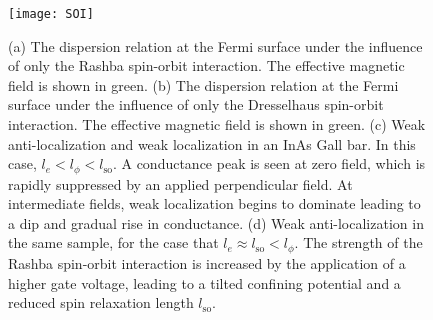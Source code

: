 \begin{figure}
  \texttt{[image: SOI]}
  \caption[The spin orbit interaction and weak anti-localization]
  {\label{fig:SOI}(a) The dispersion relation at the Fermi surface under the influence of only the Rashba spin-orbit interaction. The effective
  magnetic field is shown in green. (b) The dispersion relation at the Fermi surface under the influence of only the Dresselhaus spin-orbit interaction.
  The effective magnetic field is shown in green. (c) Weak anti-localization and weak localization in an InAs Gall bar. In this case, $l_e < l_\phi < l_\textrm{so}$. A
  conductance peak is seen at zero field, which is rapidly suppressed by an applied perpendicular field. At intermediate fields, weak localization
  begins to dominate leading to a dip and gradual rise in conductance. (d) Weak anti-localization in the same sample, for the case that $l_e \approx l_\textrm{so} < l_\phi$.
  The strength of the Rashba spin-orbit interaction is increased by the application of a higher gate voltage, leading to a tilted confining potential and
  a reduced spin relaxation length $l_\textrm{so}$.}
\end{figure}

